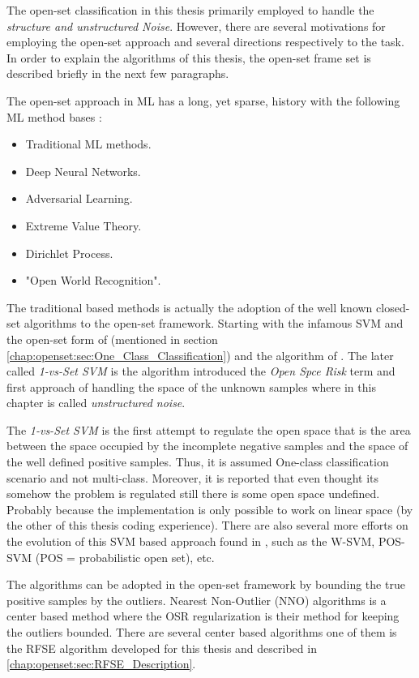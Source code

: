 The open-set classification in this thesis primarily employed to handle the \textit{structure and unstructured Noise}. However, there are several motivations for employing the open-set approach and several directions respectively to the task. In order to explain the algorithms of this thesis, the open-set frame set is described briefly in the next few paragraphs.

The open-set approach in ML has a long, yet sparse, history with the following ML method bases \parencite{geng2018recent}:

\begin{itemize}
    \item Traditional ML methods.
    \item Deep Neural Networks.
    \item Adversarial Learning.
    \item Extreme Value Theory.
    \item Dirichlet Process.
    \item "Open World Recognition".
\end{itemize}

The traditional based methods is actually the adoption of the well known closed-set algorithms to the open-set framework. Starting with the infamous SVM and the open-set form of \parencite{manevitz2002one} (mentioned in section \ref{chap:openset:sec:One_Class_Classification}) and the algorithm of \parencite{scheirer2013toward}. The later called \textit{1-vs-Set SVM} is the algorithm introduced the \textit{Open Spce Risk} term and first approach of handling the space of the unknown samples where in this chapter is called \textit{unstructured noise}. 

The \textit{1-vs-Set SVM} is the first attempt to regulate the open space that is the area between the space occupied by the incomplete negative samples and the space of the well defined positive samples. Thus, it is assumed One-class classification scenario and not multi-class. Moreover, it is reported that even thought its somehow the problem is regulated still there is some open space undefined. Probably because the implementation is only possible to work on linear space (by the other of this thesis coding experience). There are also several more efforts on the evolution of this SVM based approach found in \parencite{geng2018recent}, such as the W-SVM, POS-SVM (POS = probabilistic open set), etc.

The  algorithms can be adopted in the open-set framework by bounding the true positive samples by the outliers. Nearest Non-Outlier (NNO) algorithms is a center based method where the OSR regularization is their method for keeping the outliers bounded. There are several center based algorithms one of them is the RFSE algorithm developed for this thesis and described in \ref{chap:openset:sec:RFSE_Description}. 

